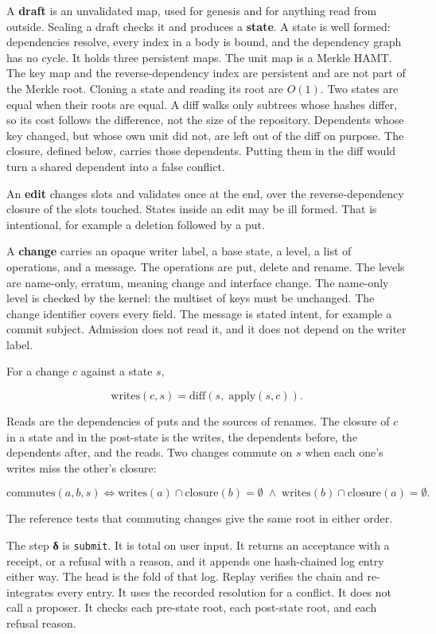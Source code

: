 \documentclass[10pt,letterpaper]{article}
\begin{document}
A \textbf{draft} is an unvalidated map, used for genesis and for
anything read from outside. Sealing a draft checks it and produces a
\textbf{state}. A state is well formed: dependencies resolve, every
index in a body is bound, and the dependency graph has no cycle. It
holds three persistent maps. The unit map is a Merkle HAMT. The key map
and the reverse-dependency index are persistent and are not part of the
Merkle root. Cloning a state and reading its root are \(O(1)\). Two
states are equal when their roots are equal. A diff walks only subtrees
whose hashes differ, so its cost follows the difference, not the size of
the repository. Dependents whose key changed, but whose own unit did
not, are left out of the diff on purpose. The closure, defined below,
carries those dependents. Putting them in the diff would turn a shared
dependent into a false conflict.

An \textbf{edit} changes slots and validates once at the end, over the
reverse-dependency closure of the slots touched. States inside an edit
may be ill formed. That is intentional, for example a deletion followed
by a put.

A \textbf{change} carries an opaque writer label, a base state, a level,
a list of operations, and a message. The operations are put, delete and
rename. The levels are name-only, erratum, meaning change and interface
change. The name-only level is checked by the kernel: the multiset of
keys must be unchanged. The change identifier covers every field. The
message is stated intent, for example a commit subject. Admission does
not read it, and it does not depend on the writer label.

For a change \(c\) against a state \(s\),

\[\mathrm{writes}(c, s) = \mathrm{diff}(s,\; \mathrm{apply}(s, c)).\]

Reads are the dependencies of puts and the sources of renames. The
closure of \(c\) in a state and in the post-state is the writes, the
dependents before, the dependents after, and the reads. Two changes
commute on \(s\) when each one's writes miss the other's closure:

\[\mathrm{commutes}(a, b, s) \iff \mathrm{writes}(a) \cap \mathrm{closure}(b) = \emptyset \;\land\; \mathrm{writes}(b) \cap \mathrm{closure}(a) = \emptyset.\]

The reference tests that commuting changes give the same root in either
order.

The step \textbf{δ} is \texttt{submit}. It is total on user input. It
returns an acceptance with a receipt, or a refusal with a reason, and it
appends one hash-chained log entry either way. The head is the fold of
that log. Replay verifies the chain and re-integrates every entry. It
uses the recorded resolution for a conflict. It does not call a
proposer. It checks each pre-state root, each post-state root, and each
refusal reason.
\end{document}
